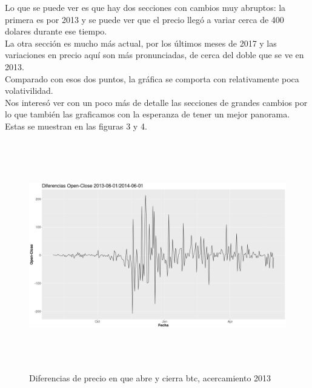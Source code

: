 \documentclass[12pt,letterpaper]{article}
\begin{document}
    Lo que se puede ver es que hay dos secciones con cambios muy abruptos: la primera es por 2013 y se puede ver que el precio lleg\'o a variar cerca de 400 dolares durante ese tiempo.
    \\
    La otra secci\'on es mucho m\'as actual, por los \'ultimos meses de 2017 y las variaciones en precio aqu\'i son m\'as pronunciadas, de cerca del doble que se ve en 2013.
    \\
    Comparado con esos dos puntos, la gr\'afica se comporta con relativamente poca volativilidad.
    \\
    Nos interes\'o ver con un poco m\'as de detalle las secciones de grandes cambios por lo que tambi\'en las graficamos con la esperanza de tener un mejor panorama. Estas se muestran en las figuras 3 y 4.
    
    \begin{figure}
        \centering

        \includegraphics[width = 18cm, height = 10cm]{btc/diferencias_BTC_OpenClose_1}

        \caption{Diferencias de precio en que abre y cierra btc, acercamiento 2013} 
    \end{figure}
\end{document}
